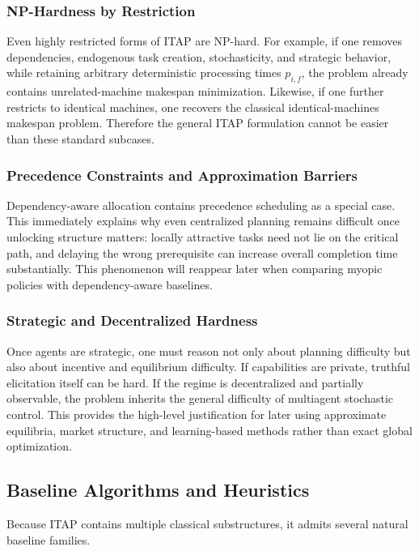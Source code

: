\subsubsection{NP-Hardness by Restriction}

Even highly restricted forms of ITAP are NP-hard. For example, if one removes dependencies, endogenous task creation, stochasticity, and strategic behavior, while retaining arbitrary deterministic processing times \(p_{i,f}\), the problem already contains unrelated-machine makespan minimization. Likewise, if one further restricts to identical machines, one recovers the classical identical-machines makespan problem. Therefore the general ITAP formulation cannot be easier than these standard subcases.

\subsubsection{Precedence Constraints and Approximation Barriers}

Dependency-aware allocation contains precedence scheduling as a special case. This immediately explains why even centralized planning remains difficult once unlocking structure matters: locally attractive tasks need not lie on the critical path, and delaying the wrong prerequisite can increase overall completion time substantially. This phenomenon will reappear later when comparing myopic policies with dependency-aware baselines.

\subsubsection{Strategic and Decentralized Hardness}

Once agents are strategic, one must reason not only about planning difficulty but also about incentive and equilibrium difficulty. If capabilities are private, truthful elicitation itself can be hard. If the regime is decentralized and partially observable, the problem inherits the general difficulty of multiagent stochastic control. This provides the high-level justification for later using approximate equilibria, market structure, and learning-based methods rather than exact global optimization.

\subsection{Baseline Algorithms and Heuristics}

Because ITAP contains multiple classical substructures, it admits several natural baseline families.

